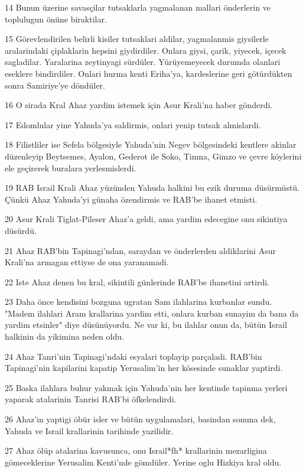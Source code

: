 \par 14 Bunun üzerine savasçilar tutsaklarla yagmalanan mallari önderlerin ve toplulugun önüne biraktilar.
\par 15 Görevlendirilen belirli kisiler tutsaklari aldilar, yagmalanmis giysilerle aralarindaki çiplaklarin hepsini giydirdiler. Onlara giysi, çarik, yiyecek, içecek sagladilar. Yaralarina zeytinyagi sürdüler. Yürüyemeyecek durumda olanlari eseklere bindirdiler. Onlari hurma kenti Eriha'ya, kardeslerine geri götürdükten sonra Samiriye'ye döndüler.
\par 16 O sirada Kral Ahaz yardim istemek için Asur Krali'na haber gönderdi.
\par 17 Edomlular yine Yahuda'ya saldirmis, onlari yenip tutsak almislardi.
\par 18 Filistliler ise Sefela bölgesiyle Yahuda'nin Negev bölgesindeki kentlere akinlar düzenleyip Beytsemes, Ayalon, Gederot ile Soko, Timna, Gimzo ve çevre köylerini ele geçirerek buralara yerlesmislerdi.
\par 19 RAB Israil Krali Ahaz yüzünden Yahuda halkini bu ezik duruma düsürmüstü. Çünkü Ahaz Yahuda'yi günaha özendirmis ve RAB'be ihanet etmisti.
\par 20 Asur Krali Tiglat-Pileser Ahaz'a geldi, ama yardim edecegine onu sikintiya düsürdü.
\par 21 Ahaz RAB'bin Tapinagi'ndan, saraydan ve önderlerden aldiklarini Asur Krali'na armagan ettiyse de ona yaranamadi.
\par 22 Iste Ahaz denen bu kral, sikintili günlerinde RAB'be ihanetini artirdi.
\par 23 Daha önce kendisini bozguna ugratan Sam ilahlarina kurbanlar sundu. "Madem ilahlari Aram krallarina yardim etti, onlara kurban sunayim da bana da yardim etsinler" diye düsünüyordu. Ne var ki, bu ilahlar onun da, bütün Israil halkinin da yikimina neden oldu.
\par 24 Ahaz Tanri'nin Tapinagi'ndaki esyalari toplayip parçaladi. RAB'bin Tapinagi'nin kapilarini kapatip Yerusalim'in her kösesinde sunaklar yaptirdi.
\par 25 Baska ilahlara buhur yakmak için Yahuda'nin her kentinde tapinma yerleri yaparak atalarinin Tanrisi RAB'bi öfkelendirdi.
\par 26 Ahaz'in yaptigi öbür isler ve bütün uygulamalari, basindan sonuna dek, Yahuda ve Israil krallarinin tarihinde yazilidir.
\par 27 Ahaz ölüp atalarina kavusunca, onu Israil*fh* krallarinin mezarligina gömeceklerine Yerusalim Kenti'nde gömdüler. Yerine oglu Hizkiya kral oldu.

